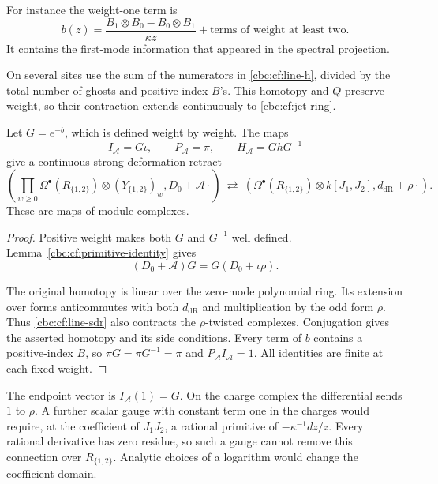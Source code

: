 For instance the weight-one term is
\[
 b(z)=\frac{B_1\otimes B_0-B_0\otimes B_1}{\kappa z}
                  +\text{terms of weight at least two}.
\]
It contains the first-mode information that appeared in the
spectral projection.

On several sites use the sum of the numerators in
\eqref{cbc:cf:line-h}, divided by the total number of ghosts and
positive-index $B$'s. This homotopy and $Q$ preserve weight,
so their contraction extends continuously to
\eqref{cbc:cf:jet-ring}.

\begin{theorem}\label{cbc:cf:line-retract}
Let $G=e^{-b}$, which is defined weight by weight. The maps
\[
 I_{\mathcal A}=G\iota,\qquad
 P_{\mathcal A}=\pi,\qquad
 H_{\mathcal A}=GhG^{-1}
\]
give a continuous strong deformation retract
\[
 \left(\prod_{w\geq0}
       \Omega^\bullet(R_{\{1,2\}})\otimes(Y_{\{1,2\}})_w,
       D_0+\mathcal A\cdot\right)
 \ \rightleftarrows\
 \left(\Omega^\bullet(R_{\{1,2\}})\otimes k[J_1,J_2],
       d_{\mathrm{dR}}+\rho\cdot\right).
\]
These are maps of module complexes.
\end{theorem}
\begin{proof}
Positive weight makes both $G$ and $G^{-1}$ well defined.
Lemma~\ref{cbc:cf:primitive-identity} gives
\[
 (D_0+\mathcal A)G=G(D_0+\iota\rho).
\]

The original homotopy is linear over the zero-mode polynomial
ring. Its extension over forms anticommutes with both
$d_{\mathrm{dR}}$ and multiplication by the odd form $\rho$.
Thus \eqref{cbc:cf:line-sdr} also contracts the $\rho$-twisted
complexes. Conjugation gives the asserted homotopy and its side
conditions. Every term of $b$ contains a positive-index $B$,
so $\pi G=\pi G^{-1}=\pi$ and $P_{\mathcal A}I_{\mathcal A}=1$.
All identities are finite at each fixed weight.
\end{proof}

The endpoint vector is $I_{\mathcal A}(1)=G$.
On the charge complex the differential sends $1$ to $\rho$.
A further scalar gauge with constant term one in the charges
would require, at the coefficient of $J_1J_2$, a rational
primitive of $-\kappa^{-1}dz/z$. Every rational derivative
has zero residue, so such a gauge cannot remove this connection
over $R_{\{1,2\}}$. Analytic choices of a logarithm would change
the coefficient domain.

